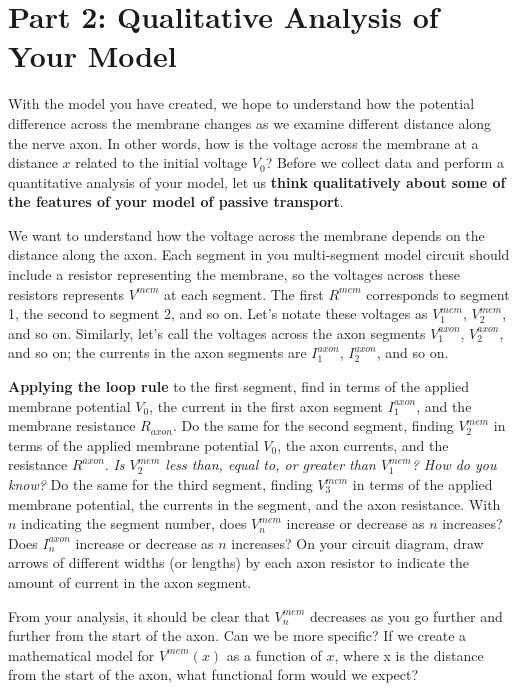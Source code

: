 \section*{Part 2: Qualitative Analysis of Your Model}
With the model you have created, we hope to understand how the potential difference across the membrane changes as we examine different distance along the nerve axon.
In other words, how is the voltage across the membrane at a distance $x$ related to the initial voltage $V_{0}$?
Before we collect data and perform a quantitative analysis of your model, let us \textbf{think qualitatively about some of the features of your model of passive transport}.
\par 
We want to understand how the voltage across the membrane depends on the distance along the axon.
Each segment in you multi-segment model circuit should include a resistor representing the membrane, so the voltages across these resistors represents $V^{mem}$ at each segment.
The first $R^{mem}$ corresponds to segment 1, the second to segment 2, and so on. 
Let's notate these voltages as $V^{mem}_{1}$, $V^{mem}_{2}$, and so on.
Similarly, let's call the voltages across the axon segments $V^{axon}_{1}$, $V^{axon}_{2}$, and so on; the currents in the axon segments are $I^{axon}_{1}$, $I^{axon}_{2}$, and so on.
\par 
\textbf{Applying the loop rule} to the first segment, find in terms of the applied membrane potential $V_{0}$, the current in the first axon segment $I^{axon}_{1}$, and the membrane resistance $R_{axon}$.
Do the same for the second segment, finding $V^{mem}_{2}$ in terms of the applied membrane potential $V_{0}$, the axon currents, and the resistance $R^{axon}$.
\emph{Is $V^{mem}_{2}$ less than, equal to, or greater than $V^{mem}_{1}$? How do you know?}
Do the same for the third segment, finding $V^{mem}_{3}$ in terms of the applied membrane potential, the currents in the segment, and the axon resistance.
With $n$ indicating the segment number, does $V^{mem}_{n}$ increase or decrease as $n$ increases?
Does $I^{axon}_{n}$ increase or decrease as $n$ increases? 
On your circuit diagram, draw arrows of different widths (or lengths) by each axon resistor to indicate the amount of current in the axon segment.
\par 
From your analysis, it should be clear that $V^{mem}_{n}$ decreases as you go further and further from the start of the axon.
Can we be more specific?
If we create a mathematical model for $V^{mem}(x)$ as a function of $x$, where x is the distance from the start of the axon, what functional form would we expect?
